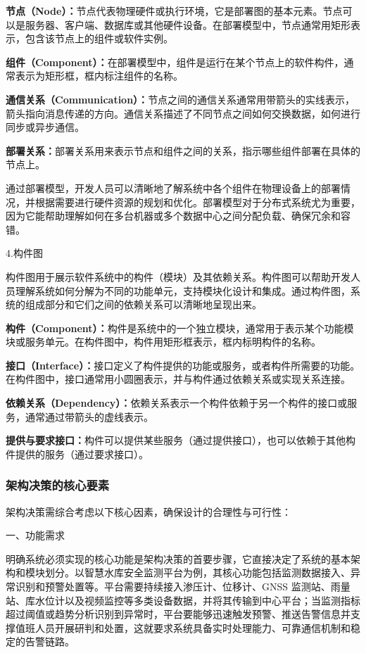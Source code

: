 \textbf{节点（Node）：}节点代表物理硬件或执行环境，它是部署图的基本元素。节点可以是服务器、客户端、数据库或其他硬件设备。在部署模型中，节点通常用矩形表示，包含该节点上的组件或软件实例。

\textbf{组件（Component）：}在部署模型中，组件是运行在某个节点上的软件构件，通常表示为矩形框，框内标注组件的名称。

\textbf{通信关系（Communication）：}节点之间的通信关系通常用带箭头的实线表示，箭头指向消息传递的方向。通信关系描述了不同节点之间如何交换数据，如何进行同步或异步通信。

\textbf{部署关系：}部署关系用来表示节点和组件之间的关系，指示哪些组件部署在具体的节点上。

通过部署模型，开发人员可以清晰地了解系统中各个组件在物理设备上的部署情况，并根据需要进行硬件资源的规划和优化。部署模型对于分布式系统尤为重要，因为它能帮助理解如何在多台机器或多个数据中心之间分配负载、确保冗余和容错。

4.构件图

构件图用于展示软件系统中的构件（模块）及其依赖关系。构件图可以帮助开发人员理解系统如何分解为不同的功能单元，支持模块化设计和集成。通过构件图，系统的组成部分和它们之间的依赖关系可以清晰地呈现出来。

\textbf{构件（Component）：}构件是系统中的一个独立模块，通常用于表示某个功能模块或服务单元。在构件图中，构件用矩形框表示，框内标明构件的名称。

\textbf{接口（Interface）：}接口定义了构件提供的功能或服务，或者构件所需要的功能。在构件图中，接口通常用小圆圈表示，并与构件通过依赖关系或实现关系连接。

\textbf{依赖关系（Dependency）：}依赖关系表示一个构件依赖于另一个构件的接口或服务，通常通过带箭头的虚线表示。

\textbf{提供与要求接口：}构件可以提供某些服务（通过提供接口），也可以依赖于其他构件提供的服务（通过要求接口）。

\subsubsection{架构决策的核心要素}
架构决策需综合考虑以下核心因素，确保设计的合理性与可行性：

一、功能需求

明确系统必须实现的核心功能是架构决策的首要步骤，它直接决定了系统的基本架构和模块划分。以智慧水库安全监测平台为例，其核心功能包括监测数据接入、异常识别和预警处置等。平台需要持续接入渗压计、位移计、GNSS 监测站、雨量站、库水位计以及视频监控等多类设备数据，并将其传输到中心平台；当监测指标超过阈值或趋势分析识别到异常时，平台要能够迅速触发预警、推送告警信息并支撑值班人员开展研判和处置，这就要求系统具备实时处理能力、可靠通信机制和稳定的告警链路。


